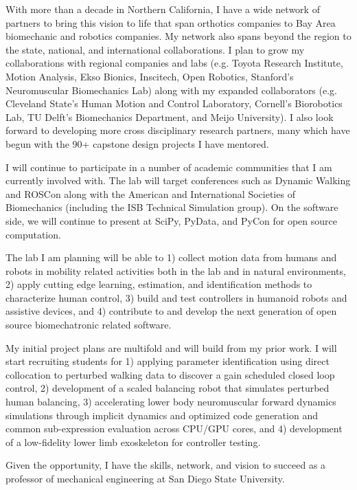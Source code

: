 \documentclass{article}
\begin{document}
With more than a decade in Northern California, I have a wide network of
partners to bring this vision to life that span orthotics companies to Bay Area
biomechanic and robotics companies. My network also spans beyond the region to
the state, national, and international collaborations. I plan to grow my
collaborations with regional companies and labs (e.g. Toyota Research
Institute, Motion Analysis, Ekso Bionics, Inscitech, Open Robotics, Stanford's
Neuromuscular Biomechanics Lab) along with my expanded collaborators (e.g.
Cleveland State's Human Motion and Control Laboratory, Cornell's Biorobotics
Lab, TU Delft's Biomechanics Department, and Meijo University). I also look
forward to developing more cross disciplinary research partners, many which
have begun with the 90+ capstone design projects I have mentored.

I will continue to participate in a number of academic communities that I am
currently involved with. The lab will target conferences such as Dynamic
Walking and ROSCon along with the American and International Societies of
Biomechanics (including the ISB Technical Simulation group). On the software
side, we will continue to present at SciPy, PyData, and PyCon for open source
computation.

The lab I am planning will be able to 1) collect motion data from humans and
robots in mobility related activities both in the lab and in natural
environments, 2) apply cutting edge learning, estimation, and identification
methods to characterize human control, 3) build and test controllers in
humanoid robots and assistive devices, and 4) contribute to and develop the
next generation of open source biomechatronic related software.

My initial project plans are multifold and will build from my prior work. I
will start recruiting students for 1) applying parameter identification using
direct collocation to perturbed walking data to discover a gain scheduled
closed loop control, 2) development of a scaled balancing robot that simulates
perturbed human balancing, 3) accelerating lower body neuromuscular forward
dynamics simulations through implicit dynamics and optimized code generation
and common sub-expression evaluation across CPU/GPU cores, and 4) development
of a low-fidelity lower limb exoskeleton for controller testing.

Given the opportunity, I have the skills, network, and vision to succeed as a
professor of mechanical engineering at San Diego State University.



\end{document}
